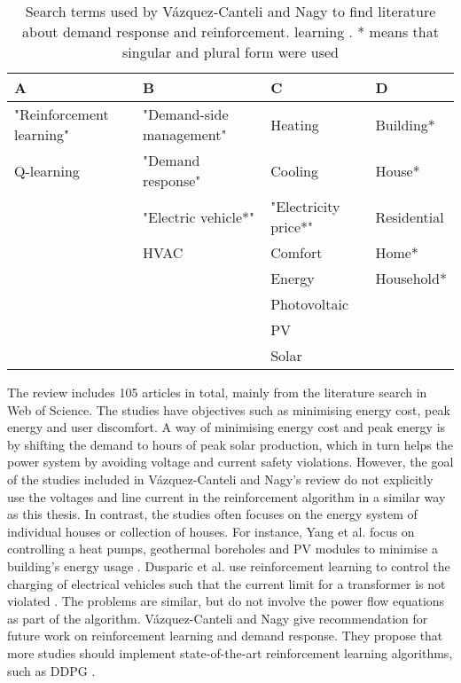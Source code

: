 \documentclass[class=book, crop=false]{standalone}
\begin{document}
\begin{table}[ht]
\centering
\begin{tabular}{llll}
A                        & B                        & C                    & D           \\
\hline
"Reinforcement learning" & "Demand-side management" & Heating              & Building*   \\
Q-learning               & "Demand response"        & Cooling              & House*      \\
                         & "Electric vehicle*"      & "Electricity price*" & Residential \\
                         & HVAC                     & Comfort              & Home*       \\
                         &                          & Energy               & Household*  \\
                         &                          & Photovoltaic         &             \\
                         &                          & PV                   &             \\
                         &                          & Solar                &            
                        \\
                        \hline
\end{tabular}
\caption{Search terms used by Vázquez-Canteli and Nagy to find literature about demand response and reinforcement. learning \cite{vazquez2019reinforcement}. * means that singular and plural form were used}
\label{table:soa:searchterms}
\end{table}

The review includes 105 articles in total, mainly from the literature search in Web of Science. The studies have objectives such as minimising energy cost, peak energy and user discomfort. A way of minimising energy cost and peak energy is by shifting the demand to hours of peak solar production, which in turn helps the power system by avoiding voltage and current safety violations. However, the goal of the studies included in Vázquez-Canteli and Nagy's review do not explicitly use the voltages and line current in the reinforcement algorithm in a similar way as this thesis. In contrast, the studies often focuses on the energy system of individual houses or collection of houses. For instance,  Yang et al. focus on controlling a heat pumps, geothermal boreholes and PV modules to minimise a building's energy usage \cite{yang2015reinforcement}.  Dusparic et al. use reinforcement learning to control the charging of electrical vehicles such that the current limit for a transformer is not violated \cite{dusparic2013multi}. The problems are similar, but do not involve the power flow equations as part of the algorithm. Vázquez-Canteli and Nagy give recommendation for future work on reinforcement learning and demand response. They propose that more studies should implement state-of-the-art reinforcement learning algorithms, such as DDPG \cite{vazquez2019reinforcement}.   
\end{document}
